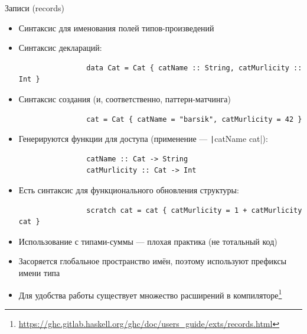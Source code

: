     \begin{frame}[fragile]{Записи (records)}
        \vspace{-0.5em}
        \begin{itemize}
            \item[\defi] Синтаксис для именования полей типов-произведений
            \item Синтаксис деклараций:
            \begin{verbatim}
                data Cat = Cat { catName :: String, catMurlicity :: Int }
            \end{verbatim}
            \item Синтаксис создания (и, соответственно, паттерн-матчинга)
            \begin{verbatim}
                cat = Cat { catName = "barsik", catMurlicity = 42 }
            \end{verbatim}
            \item Генерируются функции для доступа (применение --- \texttt|catName cat|):
            \begin{verbatim}
                catName :: Cat -> String
                catMurlicity :: Cat -> Int
            \end{verbatim}
            \item Есть синтаксис для функционального обновления структуры:
            \begin{verbatim}
                scratch cat = cat { catMurlicity = 1 + catMurlicity cat }
            \end{verbatim}
            \item[\practical] Использование с типами-суммы --- плохая практика (не тотальный код)
            \item[\practical] Засоряется глобальное пространство имён, поэтому используют префиксы имени типа
            \item[\practical] Для удобства работы существует множество расширений в компиляторе\footnote{\color{blue}\url{https://ghc.gitlab.haskell.org/ghc/doc/users_guide/exts/records.html}}
        \end{itemize}
    \end{frame}

